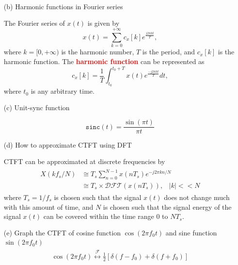 \documentclass[a4paper, 12pt]{article}
\begin{document}
\begin{itemize}
\begin{itemize}
\pagebreak
\item[(b)]{Harmonic functions in Fourier series}
\begin{tcolorbox}
The Fourier series of $x(t)$ is given by
\begin{equation}
x(t) = \sum_{k=0}^{+\infty}{c_{x}[k] e^{\frac{j2\pi k t}{T}}},
\end{equation}
where $k = [0, +\infty)$ is the harmonic number, $T$ is the period, and $c_{x}[k]$ is the harmonic function. The \textcolor{red}{\textbf{harmonic function}} can be represented as 
\begin{equation}
c_{x}[k] = \frac{1}{T} \int_{t_{0}}^{t_{0}+T}{x(t)e^{\frac{-j2\pi k t}{T}}} dt,
\end{equation}
where $t_{0}$ is any arbitrary time.
\end{tcolorbox}

\item[(c)]{Unit-sync function}
\begin{tcolorbox}
\begin{equation}
\mathtt{sinc} (t) = \frac{\sin(\pi t)}{\pi t}
\end{equation}
\end{tcolorbox}

\item[(d)]{How to approximate CTFT using DFT}
\begin{tcolorbox}
CTFT can be approximated at discrete frequencies by
\begin{equation}
\begin{gathered}
\begin{alignedat}{1}
X(kf_{s}/N) & \cong T_{s}\sum_{n=0}^{N-1}x(nT_{s})e^{-j2\pi kn/N} \\
& \cong T_{s} \times \mathcal{DFT}(x(nT_{s})), \; \; \; |k| << N
\end{alignedat}
\end{gathered}
\end{equation}
where $T_{s} = 1/f_{s}$ is chosen such that the signal $x(t)$ does not change much with this amount of time, and $N$ is chosen such that the signal energy of the signal $x(t)$ can be covered within the time range $0$ to $NT_{s}$.
\end{tcolorbox}

\item[(e)]{Graph the CTFT of cosine function $\cos ( 2\pi f_{0} t)$ and sine function $\sin ( 2 \pi f_{0} t)$}
\begin{equation}
\begin{gathered}
\begin{alignedat}{1}
\cos(2 \pi f_{0}t) \overset{\mathcal{F}}{\leftrightarrow} \frac{1}{2} \left[ \delta(f - f_{0}) + \delta (f+ f_{0})\right]
\end{alignedat}
\end{gathered}
\end{equation}


\end{itemize}
\end{itemize}
\end{document}
